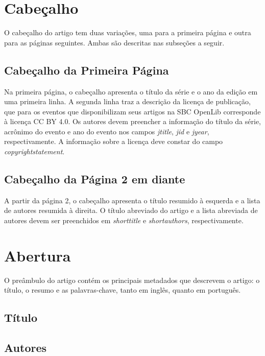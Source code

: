 \documentclass[portuguese,notblind]{sbc20}
\begin{document}
\section{Cabeçalho}

O cabeçalho do artigo tem duas variações, uma para a primeira página e outra para as páginas seguintes. Ambas são descritas nas subseções a seguir.

\subsection{Cabeçalho da Primeira Página}

Na primeira página, o cabeçalho apresenta o título da série e o ano da edição em uma primeira linha. A segunda linha traz a descrição da licença de publicação, que para os eventos que disponibilizam seus artigos na SBC OpenLib corresponde à licença CC BY 4.0. Os autores devem preencher a informação do título da série, acrônimo do evento e ano do evento nos campos \textit{jtitle}, \textit{jid} e \textit{jyear}, respectivamente. A informação sobre a licença deve constar do campo \textit{copyrightstatement}.

\subsection{Cabeçalho da Página 2 em diante}

A partir da página 2, o cabeçalho apresenta o título resumido à esquerda e a lista de autores resumida à direita. O título abreviado do artigo e a lista abreviada de autores devem ser preenchidos em \textit{shorttitle} e \textit{shortauthors}, respectivamente.

\section{Abertura}

O preâmbulo do artigo contém os principais metadados que descrevem o artigo: o título, o resumo e as palavras-chave, tanto em inglês, quanto em português.

\subsection{Título}

\subsection{Autores}
\end{document}
